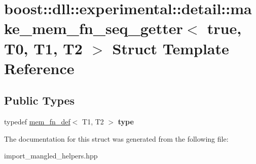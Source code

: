 \hypertarget{a01488}{}\section{boost\+:\+:dll\+:\+:experimental\+:\+:detail\+:\+:make\+\_\+mem\+\_\+fn\+\_\+seq\+\_\+getter$<$ true, T0, T1, T2 $>$ Struct Template Reference}
\label{a01488}
\subsection*{Public Types}
\begin{DoxyCompactItemize}
\item 
\mbox{\label{a01488_afb2258e5769451a88c219a15dd15fcea}} 
typedef \hyperlink{a01476}{mem\+\_\+fn\+\_\+def}$<$ T1, T2 $>$ {\bfseries type}
\end{DoxyCompactItemize}


The documentation for this struct was generated from the following file\+:\begin{DoxyCompactItemize}
\item 
import\+\_\+mangled\+\_\+helpers.\+hpp\end{DoxyCompactItemize}
